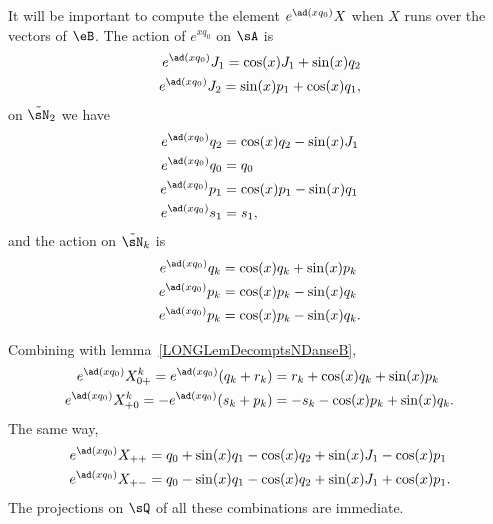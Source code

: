 It will be important to compute the element $ e^{\ad(xq_0)}X$ when $X$ runs over the vectors of $\eB$.
%
The action of $e^{xq_0}$ on $\sA$ is
\begin{subequations}			\label{LONGSubEqsAdxqzJJ}
	\begin{align}
		e^{\ad(xq_0)}J_1=\cos(x)J_1+\sin(x)q_2 \\
		e^{\ad(xq_0)}J_2=\sin(x)p_1+\cos(x)q_1,
	\end{align}
\end{subequations}
on $\tilde\sN_2$ we have
\begin{subequations}					\label{LONGSubEqsexpxzqpsdzuu}
	\begin{align}
		e^{\ad(xq_0)}q_2 & =\cos(x)q_2-\sin(x)J_1                       \\
		e^{\ad(xq_0)}q_0 & =q_0                                         \\
		e^{\ad(xq_0)}p_1 & =\cos(x)p_1-\sin(x)q_1 		\label{LONGEqAdqzpUn} \\
		e^{\ad(xq_0)}s_1 & =s_1,
	\end{align}
\end{subequations}
and the action on $\tilde\sN_k$ is
\begin{subequations}		\label{LONGEqExpAdqkpk}
	\begin{align}
		e^{\ad(xq_0)}q_k & =\cos(x)q_k+\sin(x)p_k  \\
		e^{\ad(xq_0)}p_k & =\cos(x)p_k-\sin(x)q_k  \\
		e^{\ad(xq_0)}p_k & =\cos(x)p_k-\sin(x)q_k.
	\end{align}
\end{subequations}

Combining with lemma~\ref{LONGLemDecomptsNDanseB},
\begin{subequations}			\label{LONGEqExpoQzSurNk}
	\begin{align}
		e^{\ad(xq_0)}X_{0+}^k=e^{\ad(xq_0)}(q_k+r_k)  & =r_k+\cos(x)q_k+\sin(x)p_k		\label{LONGEqExpoQzSurNka}   \\
		e^{\ad(xq_0)}X_{+0}^k=-e^{\ad(xq_0)}(s_k+p_k) & =-s_k-\cos(x)p_k+\sin(x)q_k.\label{LONGEqExpoQzSurNkb}
	\end{align}
\end{subequations}
The same way,
\begin{subequations}			\label{LONGEqExpoQzN}
	\begin{align}
		e^{\ad(xq_0)}X_{++} & =q_0+\sin(x)q_1-\cos(x)q_2+\sin(x)J_1-\cos(x)p_1  \\
		e^{\ad(xq_0)}X_{+-} & =q_0-\sin(x)q_1-\cos(x)q_2+\sin(x)J_1+\cos(x)p_1.
	\end{align}
\end{subequations}
The projections on $\sQ$ of all these combinations are immediate.

